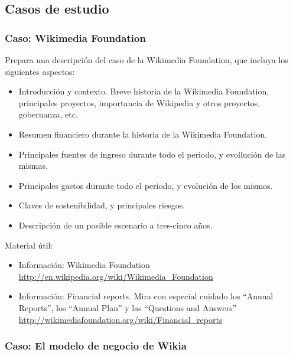 \documentclass[a4paper,12pt]{article}
\begin{document}
\subsection{Casos de estudio}

\subsubsection{Caso: Wikimedia Foundation}
\label{sub:case-wikimedia}

Prepara una descripción del caso de la Wikimedia Foundation, que incluya los siguientes aspectos:

\begin{itemize}
\item Introducción y contexto. Breve historia de la Wikimedia Foundation, principales proyectos, importancia de Wikipedia y otros proyectos, gobernanza, etc.
\item Resumen financiero durante la historia de la Wikimedia Foundation.
\item Principales fuentes de ingreso durante todo el periodo, y evollución de las mismas.
\item Principales gastos durante todo el periodo, y evolución de los mismos.
\item Claves de sostenibilidad, y principales riesgos.
\item Descripción de un posible escenario a tres-cinco años.
\end{itemize}

Material útil:

\begin{itemize}
\item Información: Wikimedia Foundation \\
  \url{http://en.wikipedia.org/wiki/Wikimedia_Foundation}
\item Información: Financial reports. Mira con especial cuidado los ``Annual Reports'', los ``Annual Plan'' y las ``Questions and Answers'' \\
  \url{http://wikimediafoundation.org/wiki/Financial_reports}
\end{itemize}

\subsubsection{Caso: El modelo de negocio de Wikia}
\label{sub:case-wikia}
\end{document}
